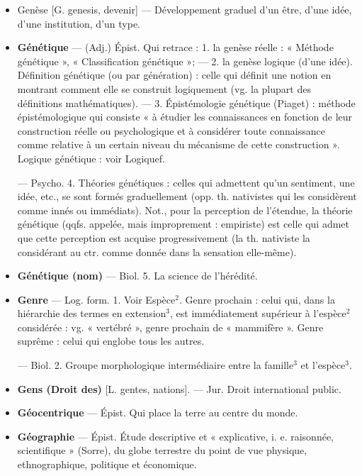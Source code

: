 \begin{itemize}[leftmargin=1cm, label=, itemsep=1pt]
\item {\bf }Genèse [G. genesis, devenir] — Développement graduel d’un être,
d’une idée, d’une institution, d’un
type.

\item {\bf Génétique} — (Adj.) Épist. Qui retrace :
1. la genèse réelle : « Méthode génétique », « Classification génétique »;
— 2. la genèse logique (d’une idée).
Définition génétique (ou par génération) : celle qui définit une notion
en montrant comment elle se construit logiquement (vg. la plupart
des définitions mathématiques). — 3. Épistémologie génétique (Piaget) : méthode
épistémologique qui consiste « à
étudier les connaissances en fonction de leur construction réelle ou
psychologique et à considérer toute
connaissance comme relative à un
certain niveau du mécanisme de
cette construction ». Logique génétique : voir Logiquef.

— Psycho. 4. Théories génétiques : celles qui admettent qu’un
sentiment, une idée, etc., se sont
formés graduellement (opp. th. nativistes qui les considèrent comme
innés ou immédiats). Not., pour la
perception de l'étendue, la théorie
génétique (qqfs. appelée, mais improprement : empiriste) est celle qui
admet que cette perception est
acquise progressivement (la th. nativiste la considérant au ctr. comme
donnée dans la sensation elle-même).

\item {\bf Génétique (nom)} — Biol. 5. La science
de l’hérédité.

\item {\bf Genre} — Log. form. 1. Voir Espèce$^2$.
Genre prochain : celui qui, dans la
hiérarchie des termes en extension$^3$,
est immédiatement supérieur à l’espèce$^2$ considérée : vg. « vertébré »,
genre prochain de « mammifère ».
Genre suprême : celui qui englobe
tous les autres.

— Biol. 2. Groupe morphologique intermédiaire entre la famille$^3$
et l'espèce$^3$.

\item {\bf Gens (Droit des)} [L. gentes, nations].
— Jur. Droit international public.

\item {\bf Géocentrique} — Épist. Qui place la
terre au centre du monde.

\item {\bf Géographie} — Épist. Étude descriptive et « explicative, i. e. raisonnée,
scientifique » (Sorre), du globe terrestre du point de vue physique,
ethnographique, politique et économique.


\end{itemize}
